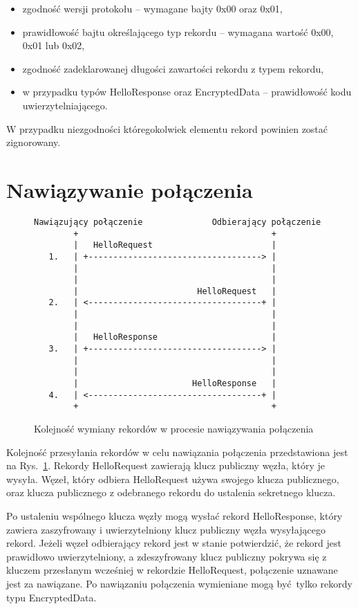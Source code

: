 \begin{itemize}
\item zgodność wersji protokołu -- wymagane bajty 0x00 oraz 0x01,
\item prawidłowość bajtu określającego typ rekordu -- wymagana wartość 0x00, 0x01 lub 0x02,
\item zgodność zadeklarowanej długości zawartości rekordu z typem rekordu,
\item w przypadku typów HelloResponse oraz EncryptedData -- prawidłowość kodu uwierzytelniającego.
\end{itemize}

W przypadku niezgodności któregokolwiek elementu rekord powinien zostać zignorowany.

\section{Nawiązywanie połączenia}

\begin{figure}
\centering
\begin{BVerbatim}
Nawiązujący połączenie              Odbierający połączenie
        +                                       +
        |   HelloRequest                        |
   1.   | +-----------------------------------> |
        |                                       |
        |                                       |
        |                        HelloRequest   |
   2.   | <-----------------------------------+ |
        |                                       |
        |                                       |
        |   HelloResponse                       |
   3.   | +-----------------------------------> |
        |                                       |
        |                                       |
        |                       HelloResponse   |
   4.   | <-----------------------------------+ |
        +                                       +
\end{BVerbatim}
\caption{Kolejność wymiany rekordów w procesie nawiązywania połączenia}
\label{fig:handshake}
\end{figure}

Kolejność przesyłania rekordów w celu nawiązania połączenia przedstawiona jest na Rys.~\ref{fig:handshake}. Rekordy HelloRequest zawierają klucz publiczny węzła, który je wysyła. Węzeł, który odbiera HelloRequest używa swojego klucza publicznego, oraz klucza publicznego z odebranego rekordu do ustalenia sekretnego klucza.

Po ustaleniu wspólnego klucza węzły mogą wysłać rekord HelloResponse, który zawiera zaszyfrowany i uwierzytelniony klucz publiczny węzła wysyłającego rekord. Jeżeli węzeł odbierający rekord jest w stanie potwierdzić, że rekord jest prawidłowo uwierzytelniony, a zdeszyfrowany klucz publiczny pokrywa się z kluczem przesłanym wcześniej w rekordzie HelloRequest, połączenie uznawane jest za nawiązane. Po nawiązaniu połączenia wymieniane mogą być tylko rekordy typu EncryptedData.

